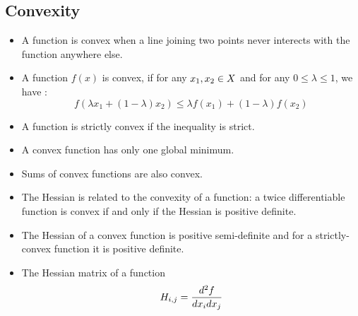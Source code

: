 \subsection{Convexity}
\begin{itemize}
\item A function is convex when a line joining two points never interects with the function anywhere else.

\item A function $f(x)$ is convex, if for any $x_1, x_2 \in \* X$ and for any $0 \leq \lambda \leq 1$, we have :
$$ f(\lambda x_1 + (1 - \lambda) x_2) \leq \lambda f(x_1) + (1 - \lambda) f(x_2)$$

\item A function is strictly convex if the inequality is strict.

\item A convex function has only one global minimum.

\item Sums of convex functions are also convex.

\item The Hessian is related to the convexity of a function: a twice differentiable function is convex if and only if the Hessian is positive definite.
\item The Hessian of a convex function is positive semi-definite and for a strictly-convex function it is positive definite.
\item The Hessian matrix of a function
\begin{align*}
    \*H_{i,j} = \frac{d^2 f}{d x_i dx_j}
\end{align*}
\end{itemize}


